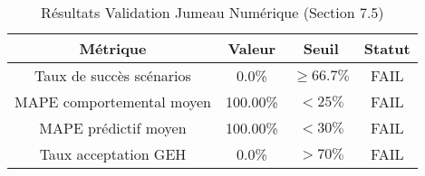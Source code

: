\begin{table}[h]
\centering
\caption{R\'esultats Validation Jumeau Num\'erique (Section 7.5)}
\begin{tabular}{|c|c|c|c|}
\hline
M\'etrique & Valeur & Seuil & Statut \\
\hline
Taux de succ\`es sc\'enarios & 0.0\% & $\geq 66.7\%$ & FAIL \\
MAPE comportemental moyen & 100.00\% & $< 25\%$ & FAIL \\
MAPE pr\'edictif moyen & 100.00\% & $< 30\%$ & FAIL \\
Taux acceptation GEH & 0.0\% & $> 70\%$ & FAIL \\
\hline
\end{tabular}
\end{table}
